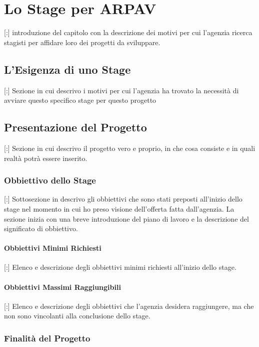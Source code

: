 \chapter{Lo Stage per ARPAV}
\label{2.0}
\thispagestyle{fancy} 

[:] introduzione del capitolo con la descrizione dei motivi per cui l'agenzia ricerca stagisti per affidare loro dei progetti da sviluppare.

\section{L'Esigenza di uno Stage}

[:] Sezione in cui descrivo i motivi per cui l'agenzia ha trovato la necessità di avviare questo specifico stage per questo progetto

\section{Presentazione del Progetto}

[:] Sezione in cui descrivo il progetto vero e proprio, in che cosa consiste e in quali realtà potrà essere inserito.

\subsection{Obbiettivo dello Stage}

[:] Sottosezione in descrivo gli obbiettivi che sono stati preposti all'inizio dello stage nel momento in cui ho preso visione dell'offerta fatta dall'agenzia.
La sezione inizia con una breve introduzione del piano di lavoro e la descrizione del significato di obbiettivo.

\subsubsection{Obbiettivi Minimi Richiesti}

[:] Elenco e descrizione degli obbiettivi minimi richiesti all'inizio dello stage.

\subsubsection{Obbiettivi Massimi Raggiungibili}

[:] Elenco e descrizione degli obbiettivi che l'agenzia desidera raggiungere, ma che non sono vincolanti alla conclusione dello stage.

\subsection{Finalità del Progetto}

